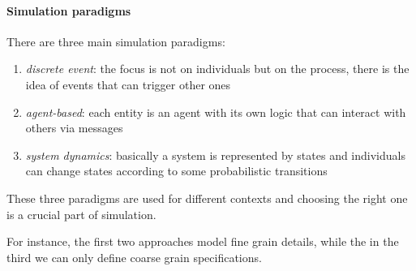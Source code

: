\paragraph{Simulation paradigms}
There are three main simulation paradigms:
\begin{enumerate}
    \item \emph{discrete event}: the focus is not on individuals but on the process, there is 
    the idea of events that can trigger other ones  
    \item \emph{agent-based}: each entity is an agent with its own logic that can 
    interact with others via messages
    \item \emph{system dynamics}: basically a system is represented by states and 
    individuals can change states according to some probabilistic transitions
\end{enumerate}
These three paradigms are used for different contexts and choosing the right one 
is a crucial part of simulation. 

For instance, the first two approaches model fine grain details, 
while the in the third we can only define coarse grain specifications.